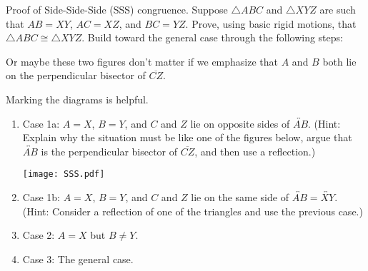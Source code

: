 \documentclass[instructornotes,nooutcomes]{ximera}
\begin{document}
\newpage

\begin{problem}
Proof of Side-Side-Side (SSS) congruence.  Suppose $\triangle ABC$ and $\triangle XYZ$ are such that $AB=XY$, $AC=XZ$, and $BC=YZ$.  Prove, using basic rigid motions, that $\triangle ABC \cong \triangle XYZ$.  Build toward the general case through the following steps:  
\begin{teachingnote}
Or maybe these two figures don't matter if we emphasize that $A$ and $B$ both lie on the perpendicular bisector of $\overline{CZ}$.  

Marking the diagrams is helpful.
\end{teachingnote}
\begin{enumerate}
\item Case 1a:  $A=X$, $B=Y$, and $C$ and $Z$ lie on opposite sides of $\overleftrightarrow{AB}$.  (Hint:  Explain why the situation must be like one of the figures below, argue that $\overleftrightarrow{AB}$ is the perpendicular bisector of $\overline{CZ}$, and then use a reflection.)
\begin{image}
\texttt{[image: SSS.pdf]}
\end{image}
\item Case 1b:  $A=X$, $B=Y$, and $C$ and $Z$ lie on the same side of $\overleftrightarrow{AB}=\overleftrightarrow{XY}$.  (Hint: Consider a reflection of one of the triangles and use the previous case.)  
\item Case 2:  $A=X$ but $B \ne Y$.
\item Case 3: The general case.  
\end{enumerate}
\vfill
\end{problem}
\end{document}
